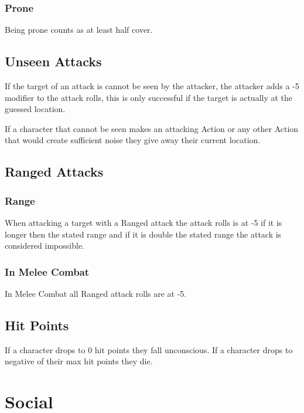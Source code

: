 \documentclass[a4paper,12pt,oneside]{book}
\begin{document}
                \subsubsection{Prone}
                Being prone counts as at least half cover.

            \subsection{Unseen Attacks}
                If the target of an attack is cannot be seen by the attacker, the attacker adds a -5 modifier to the attack rolls, this is only successful if the target is actually at the guessed location.

                If a character that cannot be seen makes an attacking Action or any other Action that would create sufficient noise they give away their current location.

            \subsection{Ranged Attacks}
                \subsubsection{Range}
                    When attacking a target with a Ranged attack the attack rolls is at -5 if it is longer then the stated range and if it is double the stated range the attack is considered impossible.

                \subsubsection{In Melee Combat}
                    In Melee Combat all Ranged attack rolls are at -5.

            \subsection{Hit Points}
                If a character drops to 0 hit points they fall unconscious. If a character drops to negative of their max hit points they die.

        \section{Social}
\end{document}
